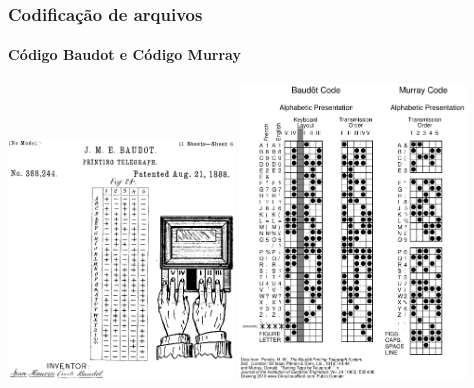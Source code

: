 \begin{frame}
\frametitle{Codificação de arquivos}
\framesubtitle{Código Baudot e Código Murray}
	\includegraphics[width=0.45\textwidth]{figures/BaudotCode.png} \hspace{2em}
	\includegraphics[width=0.45\textwidth]{figures/murraybaudot.png}
\end{frame}
